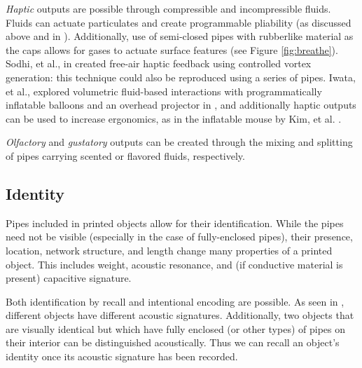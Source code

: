 \emph{Haptic} outputs are possible through compressible and incompressible fluids.  Fluids can actuate particulates and create programmable pliability (as discussed above and in \cite{Follmer-jamming}).  Additionally, use of semi-closed pipes with rubberlike material as the caps allows for gases to actuate surface features (see Figure \ref{fig:breathe}).  Sodhi, et al., in \cite{Sodhi-aireal} created free-air haptic feedback using controlled vortex generation: this technique could also be reproduced using a series of pipes.  Iwata, et al., explored volumetric fluid-based interactions with programmatically inflatable balloons and an overhead projector in \cite{Iwata-volflex}, and additionally haptic outputs can be used to increase ergonomics, as in the inflatable mouse by Kim, et al. \cite{Kim-inflatablemouse}.

\emph{Olfactory} and \emph{gustatory} outputs can be created through the mixing and splitting of pipes carrying scented or flavored fluids, respectively.

\subsection{Identity}

Pipes included in printed objects allow for their identification.  While the pipes need not be visible (especially in the case of fully-enclosed pipes), their presence, location, network structure, and length change many properties of a printed object.  This includes weight, acoustic resonance, and (if conductive material is present) capacitive signature.


Both identification by recall and intentional encoding are possible.  As seen in \cite{Ono-touchandactivate}, different objects have different acoustic signatures.  Additionally, two objects that are visually identical but which have fully enclosed (or other types) of pipes on their interior can be distinguished acoustically.  Thus we can recall an object's identity once its acoustic signature has been recorded.

